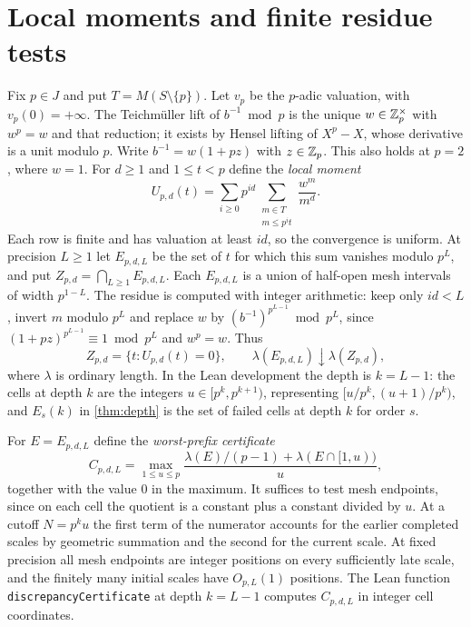 \documentclass[11pt]{article}
\newcommand{\vol}{\lambda}
\begin{document}
\section{Local moments and finite residue tests}\label{sec:local}
Fix $p\in J$ and put $T=M(S\setminus\{p\})$. Let $v_p$ be the $p$-adic valuation, with $v_p(0)=+\infty$. The Teichm\"uller lift of $b^{-1}\bmod p$ is the unique $w\in\mathbb Z_p^\times$ with $w^p=w$ and that reduction; it exists by Hensel lifting of $X^p-X$, whose derivative is a unit modulo $p$. Write $b^{-1}=w(1+pz)$ with $z\in\mathbb Z_p$. This also holds at $p=2$, where $w=1$. For $d\ge1$ and $1\le t<p$ define the \emph{local moment}
\begin{equation}\label{eq:moment}
 U_{p,d}(t)=\sum_{i\ge0}p^{id}\sum_{\substack{m\in T\\m\le p^it}}\frac{w^m}{m^d}.
\end{equation}
Each row is finite and has valuation at least $id$, so the convergence is uniform. At precision $L\ge1$ let $E_{p,d,L}$ be the set of $t$ for which this sum vanishes modulo $p^L$, and put $Z_{p,d}=\bigcap_{L\ge1}E_{p,d,L}$. Each $E_{p,d,L}$ is a union of half-open mesh intervals of width $p^{1-L}$. The residue is computed with integer arithmetic: keep only $id<L$, invert $m$ modulo $p^L$ and replace $w$ by $(b^{-1})^{p^{L-1}}\bmod p^L$, since $(1+pz)^{p^{L-1}}\equiv1\bmod p^L$ and $w^p=w$. Thus
\begin{equation}\label{eq:persistent}
 Z_{p,d}=\{t:U_{p,d}(t)=0\},\qquad\vol(E_{p,d,L})\downarrow\vol(Z_{p,d}),
\end{equation}
where $\vol$ is ordinary length. In the Lean development the depth is $k=L-1$: the cells at depth $k$ are the integers $u\in[p^k,p^{k+1})$, representing $[u/p^k,(u+1)/p^k)$, and $E_s(k)$ in \cref{thm:depth} is the set of failed cells at depth $k$ for order $s$.

For $E=E_{p,d,L}$ define the \emph{worst-prefix certificate}
\begin{equation}\label{eq:price}
 C_{p,d,L}=\max_{1\le u\le p}\frac{\vol(E)/(p-1)+\vol(E\cap[1,u))}{u},
\end{equation}
together with the value $0$ in the maximum. It suffices to test mesh endpoints, since on each cell the quotient is a constant plus a constant divided by $u$. At a cutoff $N=p^ku$ the first term of the numerator accounts for the earlier completed scales by geometric summation and the second for the current scale. At fixed precision all mesh endpoints are integer positions on every sufficiently late scale, and the finitely many initial scales have $O_{p,L}(1)$ positions. The Lean function \texttt{discrepancyCertificate} at depth $k=L-1$ computes $C_{p,d,L}$ in integer cell coordinates.
\end{document}
